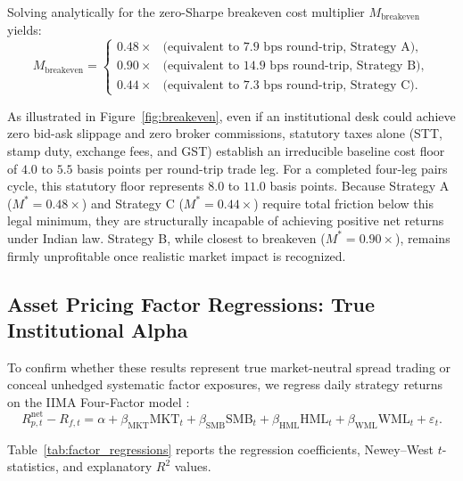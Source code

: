 \documentclass[11pt,a4paper]{article}
\begin{document}
Solving analytically for the zero-Sharpe breakeven cost multiplier $M_{\text{breakeven}}$ yields:
\begin{equation}
    M_{\text{breakeven}} = \begin{cases}
        0.48\times & \text{(equivalent to } 7.9 \text{ bps round-trip, Strategy A)}, \\
        0.90\times & \text{(equivalent to } 14.9 \text{ bps round-trip, Strategy B)}, \\
        0.44\times & \text{(equivalent to } 7.3 \text{ bps round-trip, Strategy C)}.
    \end{cases}
    \label{eq:breakeven_multiplier}
\end{equation}

As illustrated in Figure~\ref{fig:breakeven}, even if an institutional desk could achieve zero bid-ask slippage and zero broker commissions, statutory taxes alone (STT, stamp duty, exchange fees, and GST) establish an irreducible baseline cost floor of $4.0$ to $5.5$ basis points per round-trip trade leg. For a completed four-leg pairs cycle, this statutory floor represents $8.0$ to $11.0$ basis points. Because Strategy A ($M^* = 0.48\times$) and Strategy C ($M^* = 0.44\times$) require total friction below this legal minimum, they are structurally incapable of achieving positive net returns under Indian law. Strategy B, while closest to breakeven ($M^* = 0.90\times$), remains firmly unprofitable once realistic market impact is recognized.

\subsection{Asset Pricing Factor Regressions: True Institutional Alpha}
To confirm whether these results represent true market-neutral spread trading or conceal unhedged systematic factor exposures, we regress daily strategy returns on the IIMA Four-Factor model \citep{agarwalla2014four}:
\begin{equation}
    R_{p,t}^{\text{net}} - R_{f,t} = \alpha + \beta_{\text{MKT}} \text{MKT}_t + \beta_{\text{SMB}} \text{SMB}_t + \beta_{\text{HML}} \text{HML}_t + \beta_{\text{WML}} \text{WML}_t + \varepsilon_t.
    \label{eq:factor_eval_reg}
\end{equation}

Table~\ref{tab:factor_regressions} reports the regression coefficients, Newey--West $t$-statistics, and explanatory $R^2$ values.
\end{document}
